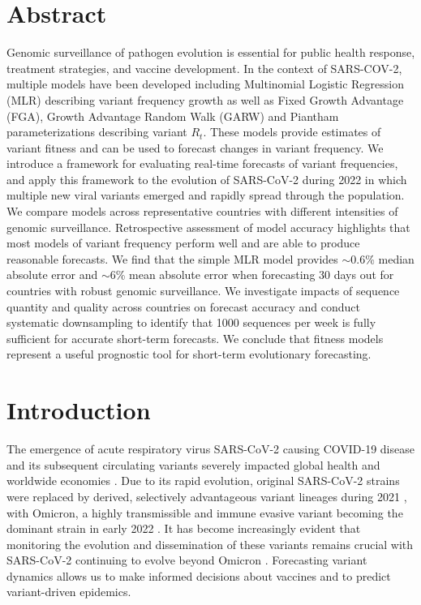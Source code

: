 \section{Abstract}
Genomic surveillance of pathogen evolution is essential for public health response, treatment strategies, and vaccine development.
In the context of SARS-COV-2, multiple models have been developed including Multinomial Logistic Regression (MLR) describing variant frequency growth as well as Fixed Growth Advantage (FGA), Growth Advantage Random Walk (GARW) and Piantham parameterizations describing variant $R_t$.
These models provide estimates of variant fitness and can be used to forecast changes in variant frequency.
We introduce a framework for evaluating real-time forecasts of variant frequencies, and apply this framework to the evolution of SARS-CoV-2 during 2022 in which multiple new viral variants emerged and rapidly spread through the population.
We compare models across representative countries with different intensities of genomic surveillance.
Retrospective assessment of model accuracy highlights that most models of variant frequency perform well and are able to produce reasonable forecasts.
We find that the simple MLR model provides $\sim$0.6\% median absolute error and $\sim$6\% mean absolute error when forecasting 30 days out for countries with robust genomic surveillance.
We investigate impacts of sequence quantity and quality across countries on forecast accuracy and conduct systematic downsampling to identify that 1000 sequences per week is fully sufficient for accurate short-term forecasts.
We conclude that fitness models represent a useful prognostic tool for short-term evolutionary forecasting.

\section{Introduction}
The emergence of acute respiratory virus SARS-CoV-2 causing COVID-19 disease and its subsequent circulating variants severely impacted global health and worldwide economies \cite{onyeaka2021covid19}.
Due to its rapid evolution, original SARS-CoV-2 strains were replaced by derived, selectively advantageous variant lineages during 2021 \cite{campbell2021increased}, with Omicron, a highly transmissible and immune evasive variant becoming the dominant strain in early 2022 \cite{viana2022rapid}.
It has become increasingly evident that monitoring the evolution and dissemination of these variants remains crucial with SARS-CoV-2 continuing to evolve beyond Omicron \cite{carabelli2023sarscov2}.
Forecasting variant dynamics allows us to make informed decisions about vaccines and to predict variant-driven epidemics.

